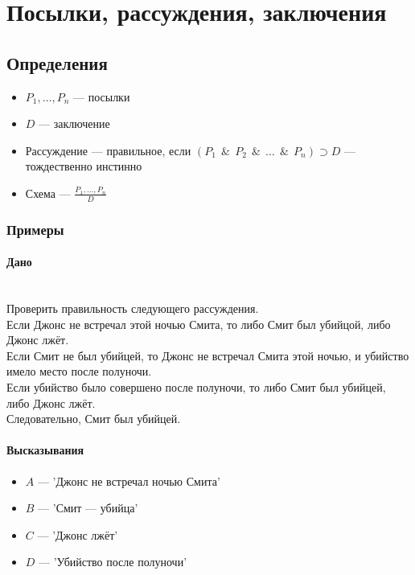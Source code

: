 \documentclass{article}
\begin{document}
\section{Посылки, рассуждения, заключения}

\subsection{Определения}
\begin{itemize}
    \item $P_1, \dots, P_n$ --- посылки
    \item $D$ --- заключение
    \item Рассуждение --- правильное, если $(P_1 ~ ~\&~ ~ P_2 ~ ~\&~ ~ \dots ~ ~\&~ ~ P_n) \supset D$ --- тождественно инстинно
    \item Схема --- $\frac{P_1, \dots, P_n}{D}$
\end{itemize}


\subsubsection{Примеры}
\paragraph{Дано}
~\\
Проверить правильность следующего рассуждения. \\
Если Джонс не встречал этой ночью Смита, то либо Смит был убийцой, либо Джонс лжёт. \\
Если Смит не был убийцей, то Джонс не встречал Смита этой ночью, и убийство имело место после полуночи. \\
Если убийство было совершено после полуночи, то либо Смит был убийцей, либо Джонс лжёт. \\
Следовательно, Смит был убийцей.

\paragraph{Высказывания}
\begin{itemize}
    \item $A$ --- 'Джонс не встречал ночью Смита'
    \item $B$ --- 'Смит --- убийца'
    \item $C$ --- 'Джонс лжёт'
    \item $D$ --- 'Убийство после полуночи'
\end{itemize}
\end{document}
